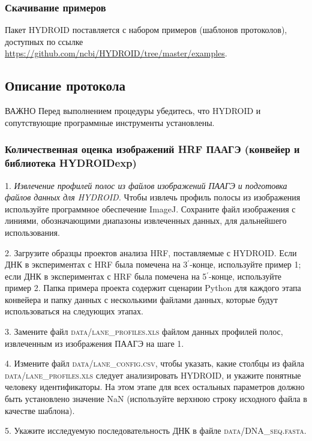  
    \subsubsection{Скачивание примеров}

    Пакет HYDROID поставляется с набором примеров (шаблонов протоколов), доступных по ссылке \url{https://github.com/ncbi/HYDROID/tree/master/examples}. 
    
    \subsection{Описание протокола}
    
    ВАЖНО Перед выполнением процедуры убедитесь, что HYDROID и сопутствующие программные инструменты установлены.
    
    \subsubsection{Количественная оценка изображений HRF ПААГЭ (конвейер и библиотека HYDROIDexp)}
    
    
    
    1. \emph{Извлечение профилей полос из файлов изображений ПААГЭ и подготовка файлов данных для HYDROID.} Чтобы извлечь профиль полосы из изображения используйте программное обеспечение ImageJ.  Сохраните файл изображения с линиями, обозначающими диапазоны извлеченных данных, для дальнейшего использования.
    
    2. Загрузите образцы проектов анализа HRF, поставляемые с HYDROID.  Если ДНК в экспериментах с HRF была помечена на 3$^\prime$-конце, используйте пример 1; если ДНК в экспериментах с HRF была помечена на 5$^\prime$-конце, используйте пример 2. Папка примера проекта содержит сценарии Python для каждого этапа конвейера и папку данных с несколькими файлами данных, которые будут использоваться на следующих этапах.
    
    3. Замените файл \textsc{data/lane\_profiles.xls} файлом данных профилей полос, извлеченным из изображения ПААГЭ на шаге 1.
    
    4. Измените файл \textsc{data/lane\_config.csv}, чтобы указать, какие столбцы из файла \textsc{data/lane\_profiles.xls}  следует анализировать HYDROID, и укажите понятные человеку идентификаторы. На этом этапе для всех остальных параметров должно быть установлено значение NaN (используйте верхнюю строку исходного файла в качестве шаблона).

    5. Укажите исследуемую последовательность ДНК в файле \textsc{data/DNA\_seq.fasta}. 
    
